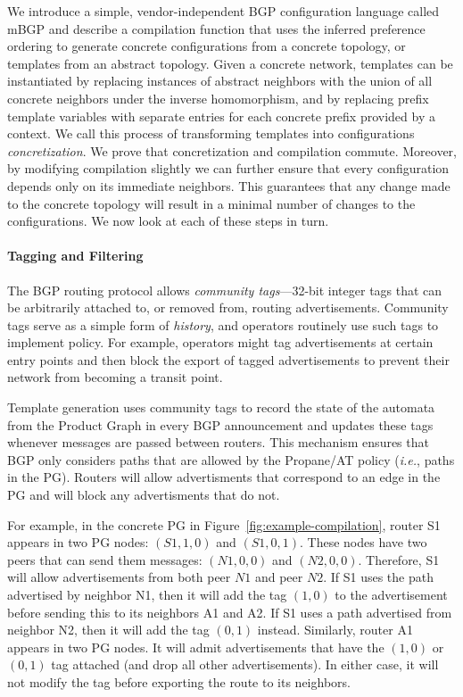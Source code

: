 \documentclass[numbers, 10pt]{sigplanconf}
\newcommand{\IE}{\emph{i.e.}}
\newcommand{\sysname}{{\text{}\small \sf Propane/AT}\xspace}
\newcommand{\mbgp}{{\small \sf mBGP}\xspace}
\newcommand{\para}[1]{\paragraph*{\textbf{#1}}}
\begin{document}
We introduce a simple, vendor-independent BGP configuration language called \mbgp and describe a compilation function that uses the inferred preference ordering to generate concrete configurations from a concrete topology, or templates from an abstract topology. Given a concrete network, templates can be instantiated by replacing instances of abstract neighbors with the union of all concrete neighbors under the inverse homomorphism, and by replacing prefix template variables with separate entries for each concrete prefix provided by a context. 
 We call this process of transforming templates into configurations \emph{concretization}.  We prove that concretization and compilation commute. Moreover, by modifying compilation slightly we can further ensure that every configuration depends only on its immediate neighbors. This guarantees that any change made to the concrete topology will result in a minimal number of changes to the configurations.
%
We now look at each of these steps in turn.
 

\para{Tagging and Filtering}

The BGP routing protocol allows \emph{community tags}---32-bit integer tags that can be arbitrarily attached to, or removed from, routing advertisements. 
Community tags serve as a simple form of \emph{history}, and operators routinely use such tags to implement policy. For example, operators might tag advertisements at certain entry points and then block the export of tagged 
advertisements to prevent their network from becoming a transit point.

Template generation uses community tags to record the state of the automata from the Product Graph in every BGP announcement and updates these tags whenever messages are passed between routers. This mechanism ensures that BGP only considers paths that are allowed by the \sysname policy (\IE, paths in the PG). Routers will allow advertisments that correspond to an edge in the PG and will block any advertisments that do not.

For example, in the concrete PG in Figure~\ref{fig:example-compilation}, router S1 appears in two PG nodes: $(S1,1,0)$ and $(S1,0,1)$. These nodes have two peers that can send them messages: $(N1,0,0)$ and $(N2,0,0)$. Therefore, S1 will allow advertisements from both peer $N1$ and peer $N2$. If S1 uses the path advertised by neighbor N1, then it will add the tag $(1,0)$ to the advertisement before sending this to its neighbors A1 and A2. If S1 uses a path advertised from neighbor N2, then it will add the tag $(0,1)$ instead. Similarly, router A1 appears in two PG nodes. It will admit advertisements that have the $(1,0)$ or $(0,1)$ tag attached (and drop all other advertisements). In either case, it will not modify the tag before exporting the route to its neighbors.
\end{document}
